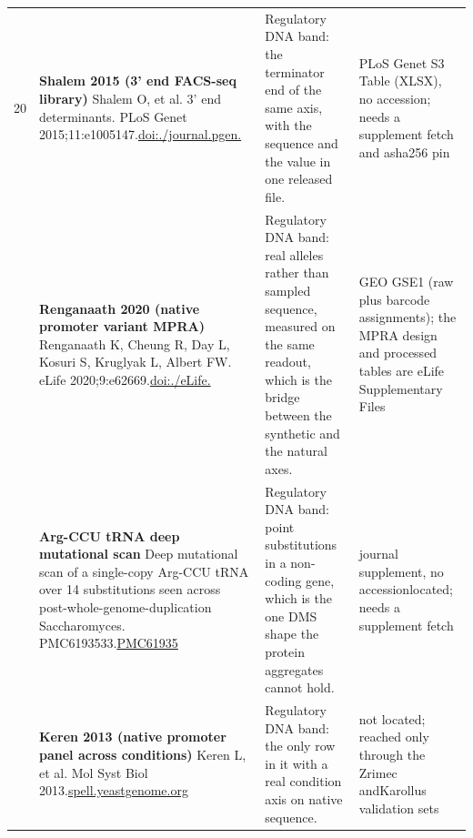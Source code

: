 \begin{landscape}
\begin{longtable}{@{}r@{\hspace{4pt}} L{78mm} L{72mm} L{76mm}@{}}
20 & \textbf{Shalem 2015 (3' end FACS-seq library)} \newline Shalem O, et al. 3' end determinants. PLoS Genet 2015;11:e1005147.\newline \href{https://doi.org/10.1371/journal.pgen.1005147}{doi:./\allowbreak journal\allowbreak .\allowbreak pgen.} & Regulatory DNA band: the terminator end of the same axis, with the sequence and the value in one released file. & PLoS Gen\allowbreak et S3 Ta\allowbreak ble (XLS\allowbreak X), no a\allowbreak ccession\allowbreak ; needs \allowbreak a supple\allowbreak ment fet\allowbreak ch and a\allowbreak  sha256 \allowbreak pin \\
 & \textbf{Renganaath 2020 (native promoter variant MPRA)} \newline Renganaath K, Cheung R, Day L, Kosuri S, Kruglyak L, Albert FW. eLife 2020;9:e62669.\newline \href{https://doi.org/10.7554/eLife.62669}{doi:./\allowbreak eLife.} & Regulatory DNA band: real alleles rather than sampled sequence, measured on the same readout, which is the bridge between the synthetic and the natural axes. & GEO GSE1 (r\allowbreak aw plus \allowbreak barcode \allowbreak assignme\allowbreak nts); th\allowbreak e MPRA d\allowbreak esign an\allowbreak d proces\allowbreak sed tabl\allowbreak es are e\allowbreak Life Sup\allowbreak plementa\allowbreak ry Files \\
 & \textbf{Arg-CCU tRNA deep mutational scan} \newline Deep mutational scan of a single-copy Arg-CCU tRNA over 14 substitutions seen across post-whole-genome-duplication Saccharomyces. PMC6193533.\newline \href{https://pmc.ncbi.nlm.nih.gov/articles/PMC6193533}{PMC61935} & Regulatory DNA band: point substitutions in a non-coding gene, which is the one DMS shape the protein aggregates cannot hold. & journal \allowbreak suppleme\allowbreak nt, no a\allowbreak ccession\allowbreak  located\allowbreak ; needs \allowbreak a supple\allowbreak ment fet\allowbreak ch \\
 & \textbf{Keren 2013 (native promoter panel across conditions)} \newline Keren L, et al. Mol Syst Biol 2013.\newline \href{https://spell.yeastgenome.org/}{spell.\allowbreak yeastge\allowbreak nome.\allowbreak org} & Regulatory DNA band: the only row in it with a real condition axis on native sequence. & not loca\allowbreak ted; rea\allowbreak ched onl\allowbreak y throug\allowbreak h the Zr\allowbreak imec and\allowbreak  Karollu\allowbreak s valida\allowbreak tion set\allowbreak s \\

\end{longtable}
\end{landscape}
